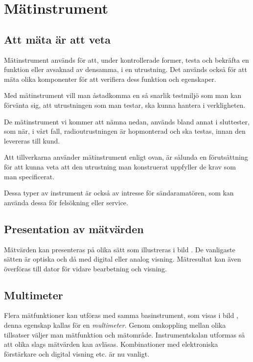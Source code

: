\section{Mätinstrument}

\subsection{Att mäta är att veta}

Mätinstrument används för att, under kontrollerade former, testa och bekräfta
en funktion eller avsaknad av densamma, i en utrustning.
Det används också för att mäta olika komponenter för att verifiera dess
funktion och egenskaper.

Med mätinstrument vill man åstadkomma en så snarlik testmiljö som man kan
förvänta sig, att utrustningen som man testar, ska kunna hantera i
verkligheten.

De mätinstrument vi kommer att nämna nedan, används bland annat i sluttester,
som när, i vårt fall, radioutrustningen är hopmonterad och ska testas, innan den
levereras till kund.

Att tillverkarna använder mätinstrument enligt ovan, är sålunda en förutsättning
för att kunna veta att den utrustning man konstruerat uppfyller de krav som man
specificerat.

Dessa typer av instrument är också av intresse för sändaramatören, som kan
använda dessa för felsökning eller service.

\subsection{Presentation av mätvärden}


Mätvärden kan presenteras på olika sätt som illustreras i bild
.
De vanligaste sätten är optiska och då med digital eller analog visning.
Mätresultat kan även överföras till dator för vidare bearbetning och visning.

\subsection{Multimeter}

Flera mätfunktioner kan utföras med samma basinstrument, som visas i
bild , denna egenskap kallas för en \emph{multimeter}.
Genom omkoppling mellan olika tillsatser väljer man mätfunktion och mätområde.
Instrumentskalan utformas så att olika slags mätvärden kan avläsas.
Kombinationer med elektroniska förstärkare och digital visning etc. är nu
vanligt.

